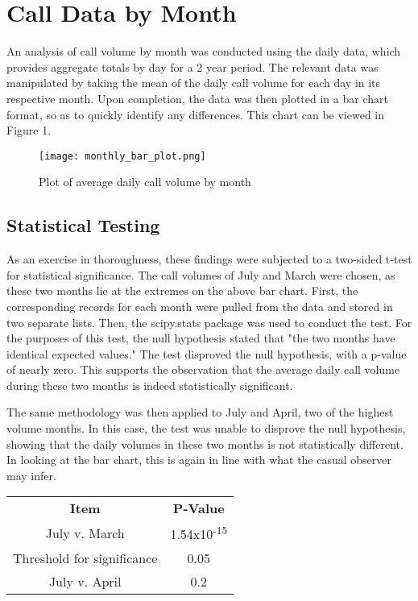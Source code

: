 \documentclass[11pt,twocolumn]{article}
\begin{document}
\section{Call Data by Month}
An analysis of call volume by month was conducted using the daily data, which provides aggregate totals by day for a 2 year period. The relevant data was manipulated by taking the mean of the daily call volume for each day in its respective month.  Upon completion, the data was then plotted in a bar chart format, so as to quickly identify any differences.  This chart can be viewed in Figure 1.

\begin{figure}[h]
  \texttt{[image: monthly\_bar\_plot.png]}
  \caption{Plot of average daily call volume by month}
\end{figure}

\subsection{Statistical Testing}
As an exercise in thoroughness, these findings were subjected to a two-sided t-test for statistical significance.  The call volumes of July and March were chosen, as these two months lie at the extremes on the above bar chart.  First, the corresponding records for each month were pulled from the data and stored in two separate lists.  Then, the scipy.stats package was used to conduct the test.  For the purposes of this test, the null hypothesis stated that "the two months have identical expected values."  The test disproved the null hypothesis, with a p-value of nearly zero.  
This supports the observation that the average daily call volume during these two months is indeed statistically significant.
\par
The same methodology was then applied to July and April, two of the highest volume months.  In this case, the test was unable to disprove the null hypothesis, showing that the daily volumes in these two months is not statistically different.  In looking at the bar chart, this is again in line with what the casual observer may infer.
\begin{center}
\begin{tabular}{ |c|c| }
\hline 
 \textbf{Item} & \textbf{P-Value} \\
 July v. March & 1.54x10\textsuperscript{-15} \\  
 Threshold for significance & 0.05 \\ 
 July v. April & 0.2 \\ 
 \hline
\end{tabular}
\end{center}
\end{document}
